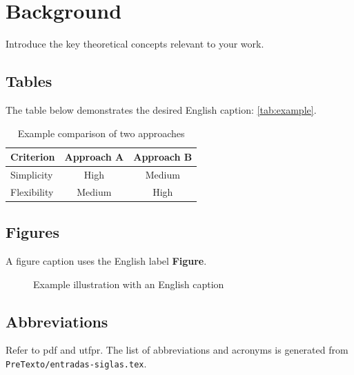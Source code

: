 \chapter{Background}\label{chap:background}
Introduce the key theoretical concepts relevant to your work.

\section{Tables}
The table below demonstrates the desired English caption: \autoref{tab:example}.
\begin{table}[htbp]
  \centering
  \caption{Example comparison of two approaches}
  \label{tab:example}
  \begin{tabular}{lcc}
    \toprule
    Criterion & Approach A & Approach B \\
    \midrule
    Simplicity & High & Medium \\
    Flexibility & Medium & High \\
    \bottomrule
  \end{tabular}
  \fonte{}
\end{table}

\section{Figures}
A figure caption uses the English label \textbf{Figure}.
\begin{figure}[htbp]
  \centering
  \caption{Example illustration with an English caption}
  \label{fig:example}
  \fonte{}
\end{figure}

\section{Abbreviations}
Refer to \gls{pdf} and \gls{utfpr}. The list of abbreviations and acronyms is generated from \texttt{PreTexto/entradas-siglas.tex}.
